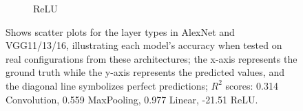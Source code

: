 \begin{figure}[h]
\begin{subfigure}[b]{0.47\textwidth}
            \caption[]%
            {{\small ReLU}}    
            \label{}
        \end{subfigure}
        \caption[Shows scatter plots for the layer types in AlexNet and VGG11/13/16, illustrating each model's accuracy when tested on real configurations from these architectures; the x-axis represents the ground truth while the y-axis represents the predicted values, and the diagonal line symbolizes perfect predictions; $R^2$ scores: 0.314 Convolution, 0.559 MaxPooling, 0.977 Linear, -21.51 ReLU.]
        {Shows scatter plots for the layer types in AlexNet and VGG11/13/16, illustrating each model's accuracy when tested on real configurations from these architectures; the x-axis represents the ground truth while the y-axis represents the predicted values, and the diagonal line symbolizes perfect predictions; $R^2$ scores: 0.314 Convolution, 0.559 MaxPooling, 0.977 Linear, -21.51 ReLU.}
        \label{fig:layer-preds-real-architectures}
\end{figure}